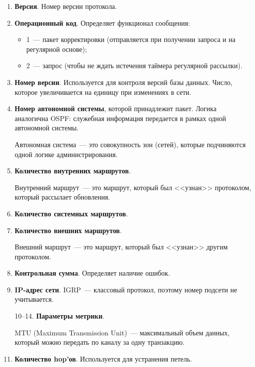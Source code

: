 \begin{enumerate}
    \item \textbf{Версия}. Номер версии протокола.
    \item \textbf{Операционный код}. Определяет функционал сообщения:
          \begin{itemize}
              \item 1~--- пакет корректировки (отправляется при получении запроса и на регулярной основе);
              \item 2~--- запрос (чтобы не ждать истечения таймера регулярной рассылки).
          \end{itemize}
    \item \textbf{Номер версии}. Используется для контроля версий базы данных. Число, которое увеличивается на единицу при изменениях в сети.
    \item \textbf{Номер автономной системы}, которой принадлежит пакет. Логика аналогична OSPF: служебная информация передается в рамках одной автономной системы.
          \begin{dd}
              Автономная система~--- это совокупность зон (сетей), которые подчиняются одной логике администрирования.
          \end{dd}
    \item \textbf{Количество внутренних маршрутов}.
          \begin{dd}
              Внутренний маршрут~--- это маршрут, который был <<узнан>> протоколом, который рассылает обновления.
          \end{dd}
    \item \textbf{Количество системных маршрутов}.
    \item \textbf{Количество внешних маршрутов}.
          \begin{dd}
              Внешний маршрут~--- это маршрут, который был <<узнан>> другим протоколом.
          \end{dd}
    \item \textbf{Контрольная сумма}. Определяет наличие ошибок.
    \item \textbf{IP-адрес сети}. IGRP~--- классовый протокол, поэтому номер подсети не учитывается.
    \item[10--14.] \textbf{Параметры метрики}.

        \begin{dd}
            MTU (Maximum Transmission Unit)~--- максимальный объем данных, который можно передать по каналу за одну транзакцию.
        \end{dd}

        \addtocounter{enumi}{5}
    \item \textbf{Количество hop'ов}. Используется для устранения петель.
\end{enumerate}

